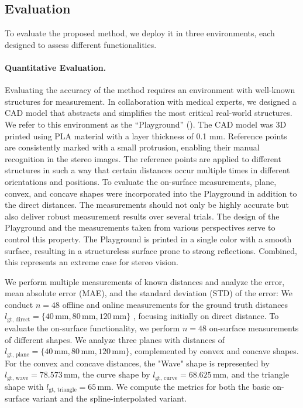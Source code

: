 \documentclass[letterpaper]{article} %
\begin{document}
\subsection{Evaluation}

To evaluate the proposed method, we deploy it in three environments, each designed to assess different functionalities.

\paragraph{Quantitative Evaluation.} Evaluating the accuracy of the method requires an environment with well-known structures for measurement. In collaboration with medical experts, we designed a CAD model that abstracts and simplifies the most critical real-world structures. We refer to this environment as the ``Playground'' (). The CAD model was 3D printed using PLA material with a layer thickness of 0.1 mm. Reference points are consistently marked with a small protrusion, enabling their manual recognition in the stereo images. The reference points are applied to different structures in such a way that certain distances occur multiple times in different orientations and positions. To evaluate the on-surface measurements, plane, convex, and concave shapes were incorporated into the Playground in addition to the direct distances. The measurements should not only be highly accurate but also deliver robust measurement results over several trials. The design of the Playground and the measurements taken from various perspectives serve to control this property. The Playground is printed in a single color with a smooth surface, resulting in a structureless surface prone to strong reflections. Combined, this represents an extreme case for stereo vision.

We perform multiple measurements of known distances and analyze the error, mean absolute error (MAE), and the standard deviation (STD) of the error: We conduct $n=48$ offline and online measurements for the ground truth distances $l_{\text{gt, direct}} = \{40\, \text{mm}, 80\, \text{mm}, 120\, \text{mm}\}$
, focusing initially on direct distance. To evaluate the on-surface functionality, we perform $n=48$ on-surface measurements of different shapes. We analyze three planes with distances of \( l_{\text{gt, plane}} = \{40\, \text{mm}, 80\, \text{mm}, 120\, \text{mm}\} \), complemented by convex and concave shapes. For the convex and concave distances, the "Wave" shape is represented by $ l_{\text{gt, wave}} = 78.573\, \text{mm} $, the curve shape by $ l_{\text{gt, curve}} = 68.625\, \text{mm} $, and the triangle shape with $ l_{\text{gt, triangle}} = 65\, \text{mm} $. We compute the metrics for both the basic on-surface variant and the spline-interpolated variant.
\end{document}
